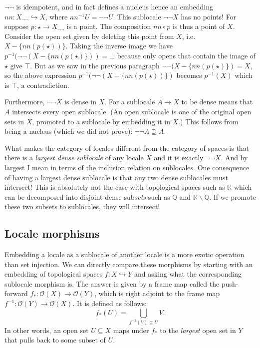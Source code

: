 \documentclass[12pt]{extarticle}
\renewcommand{\o}{\ensuremath{\mathcal{O}}}
\begin{document}
$\neg\neg$ is idempotent, and in fact defines a nucleus hence an embedding $nn:X_{\neg\neg}\hookrightarrow X$, where $nn^{-1}U=\neg\neg U$. This sublocale $\neg\neg X$ has no points! For suppose $p:\star\to X_{\neg\neg}$ is a point. The composition $nn\circ p$ is thus a point of $X$. Consider the open set given by deleting this point from $X$, i.e. $X-\{nn(p(\star))\}$. Taking the inverse image we have $p^{-1}(\neg\neg(X-\{nn(p(\star)\})) = \bot$ because only opens that contain the image of $\star$ give $\top$. But as we saw in the previous paragraph $\neg\neg(X-\{nn(p(\star)\}) = X$, so the above expression $p^{-1}(\neg\neg(X-\{nn(p(\star))\})$ becomes $p^{-1}(X)$ which is $\top$, a contradiction.

Furthermore, $\neg\neg X$ is dense in $X$. For a sublocale $A\to X$ to be dense means that $A$ intersects every open sublocale. (An open sublocale is one of the original open sets in $X$, promoted to a sublocale by embedding it in $X$.) This follows from being a nucleus (which we did not prove): $\neg\neg A \supseteq A$. 

What makes the category of locales different from the category of spaces is that there is a \emph{largest dense sublocale} of any locale $X$ and it is exactly $\neg\neg X$. And by largest I mean in terms of the inclusion relation on sublocales. One consequence of having a largest dense sublocale is that any two dense sublocales must intersect! This is absolutely not the case with topological spaces such as $\mathbb{R}$ which can be decomposed into disjoint dense sub\emph{sets} such as $\mathbb{Q}$ and $\mathbb{R}\backslash\mathbb{Q}$. If we promote these two subsets to sublocales, they will intersect!

\subsection{Locale morphisms}

Embedding a locale as a sublocale of another locale is a more exotic operation than set injection. We can directly compare these morphisms by starting with an embedding of topological spaces $f:X\hookrightarrow Y$ and asking what the corresponding sublocale morphism is. The answer is given by a frame map called the push-forward $f_*:\o(X)\to\o(Y)$, which is right adjoint to the frame map $f^{-1}:\o(Y)\to\o(X)$. It is defined as follows: $$f_*(U)=\bigcup_{f^{-1}(V)\subseteq U}V.$$ In other words, an open set $U\subseteq X$ maps under $f_*$ to the \emph{largest} open set in $Y$ that pulls back to some subset of $U$.
\end{document}
